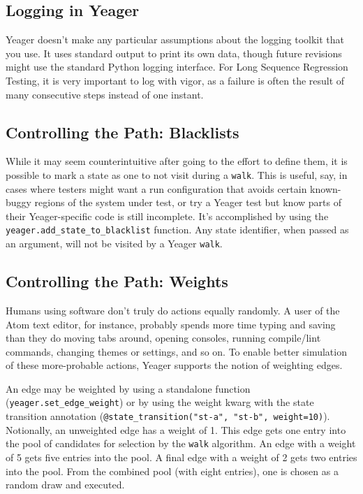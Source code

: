 \subsection{Logging in Yeager}
Yeager doesn't make any particular assumptions about the logging toolkit that you use. It uses standard output to print its own data, though future revisions might use the standard Python logging interface. For Long Sequence Regression Testing, it is very important to log with vigor, as a failure is often the result of many consecutive steps instead of one instant.

\subsection{Controlling the Path: Blacklists}
While it may seem counterintuitive after going to the effort to define them, it is possible to mark a state as one to not visit during a \texttt{walk}. This is useful, say, in cases where testers might want a run configuration that avoids certain known-buggy regions of the system under test, or try a Yeager test but know parts of their Yeager-specific code is still incomplete. It's accomplished by using the \texttt{yeager.add\_state\_to\_blacklist} function. Any state identifier, when passed as an argument, will not be visited by a Yeager \texttt{walk}. %

\subsection{Controlling the Path: Weights}
Humans using software don't truly do actions equally randomly. A user of the Atom text editor, for instance, probably spends more time typing and saving than they do moving tabs around, opening consoles, running compile/lint commands, changing themes or settings, and so on. To enable better simulation of these more-probable actions, Yeager supports the notion of weighting edges.

An edge may be weighted by using a standalone function
\\(\texttt{yeager.set\_edge\_weight}) or by using the weight kwarg with the state transition annotation (\texttt{@state\_transition("st-a", "st-b", weight=10)}). Notionally, an unweighted edge has a weight of 1. This edge gets one entry into the pool of candidates for selection by the \texttt{walk} algorithm. An edge with a weight of 5 gets five entries into the pool. A final edge with a weight of 2 gets two entries into the pool. From the combined pool (with eight entries), one is chosen as a random draw and executed.

